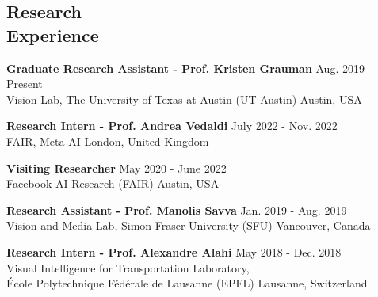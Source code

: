 \documentclass[margin, 10pt]{res} %
\begin{document}
\begin{resume}
\section{Research \\ Experience}
\textbf{Graduate Research Assistant - Prof. Kristen Grauman}  \hfill Aug. 2019 - Present \\ 
Vision Lab, The University of Texas at Austin (UT Austin) \hfill Austin, USA

\textbf{Research Intern - Prof. Andrea Vedaldi}  \hfill July 2022 - Nov. 2022 \\ 
FAIR, Meta AI \hfill London, United Kingdom


\textbf{Visiting Researcher}  \hfill May 2020 - June 2022 \\ 
Facebook AI Research (FAIR) \hfill Austin, USA

\textbf{Research Assistant - Prof. Manolis Savva}  \hfill Jan. 2019 - Aug. 2019 \\ 
Vision and Media Lab, Simon Fraser University (SFU) \hfill Vancouver, Canada 

\textbf{Research Intern - Prof. Alexandre Alahi}  \hfill May 2018 - Dec. 2018 \\ 
Visual Intelligence for Transportation Laboratory, \\
École Polytechnique Fédérale de Lausanne (EPFL) \hfill Lausanne, Switzerland


\end{resume}
\end{document}
